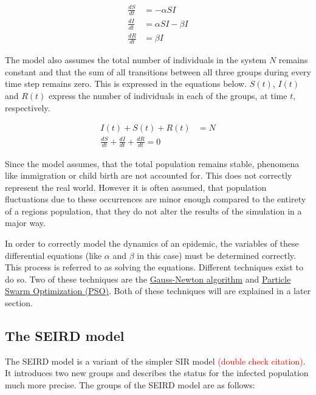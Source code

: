 \begin{align}
	\label{eq:SIR1}
	\frac{dS}{dt} &= -\alpha S I \\
	\frac{dI}{dt} &= \alpha S I - \beta I \\
	\frac{dR}{dt} &= \beta I
\end{align}

\par
The model also assumes the total number of individuals in the system $N$ remains constant and that the sum of all transitions
between all three groups during every time step remains zero. This is expressed in the equations below.
$S(t)$, $I(t)$ and $R(t)$ express the number of individuals in each of the groups, at time $t$, respectively.

\begin{align}
	\label{eq:SIR2}
	I(t) + S(t) + R(t) &= N \\
	\frac{dS}{dt} + \frac{dI}{dt} + \frac{dR}{dt} = 0
\end{align}

\par
Since the model assumes, that the total population remains stable, phenomena like immigration or child birth are not accounted
for. This does not correctly represent the real world. However it is often assumed, that population fluctuations
due to these occurrences are minor enough compared to the entirety of a regions population, that they do not alter the results of the
simulation in a major way\cite{??}.\newline

\par
In order to correctly model the dynamics of an epidemic, the variables of these differential
equations (like $\alpha$ and $\beta$ in this case) must be determined correctly. This process is referred to as solving the equations.
Different techniques exist to do so. Two of these techniques are the \hyperref[sec:Gauss]{Gauss-Newton algorithm}\cite{Gauss??} and
\hyperref[sec:PSO]{Particle Swarm Optimization (PSO)}\cite{PSO??}. Both of these techniques will are explained in a later section.



\subsection{The SEIRD model}
\label{sec:SEIRD}
The SEIRD model is a variant of the simpler SIR model\cite{knodel20173d}
\textcolor{red}{(double check citation)}. %
It introduces two new groups and describes the status for the infected population much more precise. The groups of the SEIRD
model are as follows:

